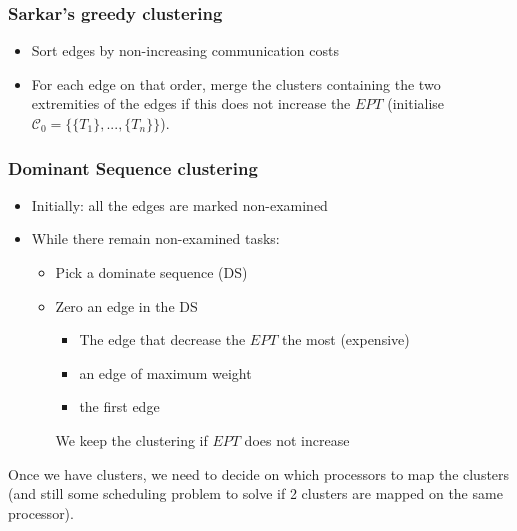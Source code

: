 \subsubsection*{Sarkar's greedy clustering}
\begin{itemize}
\item Sort edges by non-increasing communication costs
\item For each edge on that order, merge the clusters containing the two extremities of the edges if this does not increase the $EPT$ (initialise $\mathcal{C}_0=\{\{T_1\},...,\{T_n\}\}$).
\end{itemize}

\subsubsection*{Dominant Sequence clustering} 
\begin{itemize}
\item Initially: all the edges are marked non-examined
\item While there remain non-examined tasks:
\begin{itemize}
\item Pick a dominate sequence (DS)
\item Zero an edge in the DS
\begin{itemize}
\item The edge that decrease the $EPT$ the most (expensive)
\item an edge of maximum weight
\item the first edge
\end{itemize}
We keep the clustering if $EPT$ does not increase
\end{itemize}
\end{itemize}

Once we have clusters, we need to decide on which processors to map the clusters (and still some scheduling problem to solve if 2 clusters are mapped on the same processor).